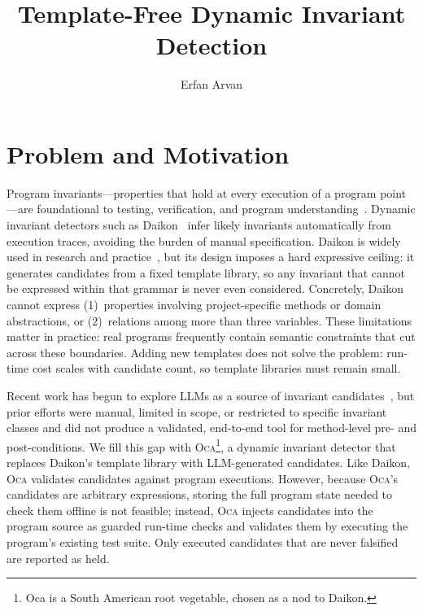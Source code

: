 \documentclass[sigplan,screen]{acmart}
\title{Template-Free Dynamic Invariant Detection}
\author{Erfan Arvan}
\affiliation{%
  \institution{New Jersey Institute of Technology}
  \city{Newark}
  \state{NJ}
  \country{USA}
}
\begin{document}
\maketitle



\section{Problem and Motivation}

Program invariants---properties that hold at every execution of a program
point---are foundational to testing, verification, and program understanding~\cite{ernst2007daikon}.
Dynamic invariant detectors such as Daikon~\cite{ernst2007daikon}
infer likely invariants automatically from execution traces,
avoiding the burden of manual specification.
Daikon is widely used in research and practice~\cite{pei2023llm,sun2025classinvgen},
but its design imposes a hard expressive ceiling:
it generates candidates from a fixed template library,
so any invariant that cannot be expressed within that grammar
is never even considered.
Concretely, Daikon cannot express (1)~properties involving
project-specific methods or domain abstractions, or
(2)~relations among more than three variables.
These limitations matter in practice:
real programs frequently contain semantic constraints
that cut across these boundaries.
Adding new templates does not solve the problem: run-time cost scales with candidate count, so template libraries must remain small.

Recent work has begun to explore LLMs as a source of invariant candidates~\cite{endres2024llm,pei2023llm,cao2025clause2inv,ma2025specgen,sun2025classinvgen},
but prior efforts were manual, limited in scope, or restricted to specific invariant classes
and did not produce a validated, end-to-end tool for method-level pre- and post-conditions.
We fill this gap with \textsc{Oca}\footnote{Oca is a South American root vegetable, chosen as a nod to Daikon.}, a dynamic invariant detector
that replaces Daikon's template library with LLM-generated candidates.
Like Daikon, \textsc{Oca} validates candidates against program executions.
However, because \textsc{Oca}'s candidates are arbitrary expressions,
storing the full program state needed to check them offline is not feasible;
instead, \textsc{Oca} injects candidates into the program source as guarded run-time checks
and validates them by executing the program's existing test suite.
Only executed candidates that are never falsified are reported as held.
\end{document}
